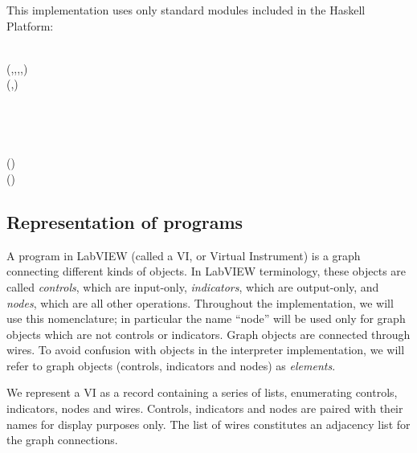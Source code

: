 
This implementation uses only standard modules included in the Haskell Platform:

\begin{hscode}\SaveRestoreHook
{}%
%
\>[B]{}\;\;\<[E]%
\\[\blanklineskip]%
\>[B]{}\;\;(,,,,){}\<[E]%
\\
\>[B]{}\;\;\;\;\;(,){}\<[E]%
\\
\>[B]{}\;\<[E]%
\\
\>[B]{}\;\<[E]%
\\
\>[B]{}\;\<[E]%
\\
\>[B]{}\;\<[E]%
\\
\>[B]{}\;\;(){}\<[E]%
\\
\>[B]{}\;\;(){}\<[E]%
\ColumnHook
\end{hscode}\resethooks

\subsection{Representation of programs}

A program in LabVIEW (called a VI, or Virtual Instrument) is a graph
connecting different kinds of objects. In LabVIEW terminology, these objects
are called \emph{controls}, which are input-only, \emph{indicators}, which are
output-only, and \emph{nodes}, which are all other operations. Throughout the
implementation, we will use this nomenclature; in particular the name ``node''
will be used only for graph objects which are not controls or indicators.
Graph objects are connected through wires. To avoid confusion with objects
in the interpreter implementation, we will refer to graph objects (controls,
indicators and nodes) as \emph{elements}.

We represent a VI as a record containing a series of lists, enumerating
controls, indicators, nodes and wires. Controls, indicators and nodes are
paired with their names for display purposes only. The list of wires
constitutes an adjacency list for the graph connections.

